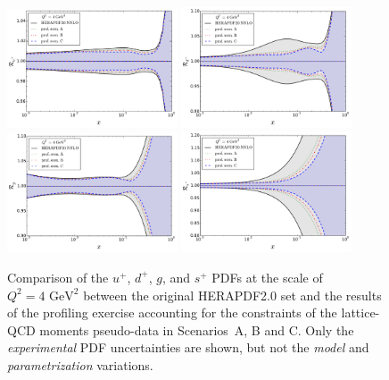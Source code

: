 \begin{figure}[!t]
\centering
\includegraphics[width=0.45\textwidth]{plots/ratio_uPubar_Q2.pdf}
\includegraphics[width=0.45\textwidth]{plots/ratio_dPdbar_Q2.pdf}\\
\includegraphics[width=0.45\textwidth]{plots/ratio_g_Q2.pdf}
\includegraphics[width=0.45\textwidth]{plots/ratio_sPsbar_Q2.pdf}
\caption{\small Comparison
of the $u^+$, $d^+$, $g$, and $s^+$ PDFs at the scale of $Q^2=4\text{ GeV}^2$
between the original  HERAPDF2.0 set and the results of the profiling
exercise accounting for the constraints of
the lattice-QCD moments
pseudo-data in Scenarios~A, B and C.
%
Only the {\it experimental} PDF uncertainties are shown,
but not the {\it model} and {\it parametrization} variations.
}
\label{fig:pdfsProf}
\end{figure}

